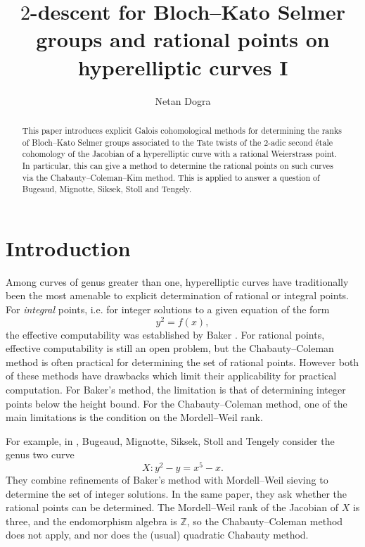 \documentclass[11pt]{amsart}
\theoremstyle{plain}
\theoremstyle{definition}
\begin{document}
\title{$2$-descent for Bloch--Kato Selmer groups and rational points on hyperelliptic curves I}
\author{Netan Dogra}
\maketitle
\pagestyle{headings}

\begin{abstract}This paper introduces explicit Galois cohomological methods for determining the ranks of Bloch--Kato Selmer groups associated to the Tate twists of the 2-adic second \'etale cohomology of the Jacobian of a hyperelliptic curve with a rational Weierstrass point. In particular, this can give a method to determine the rational points on such curves via the Chabauty--Coleman--Kim method. This is applied to answer a question of Bugeaud, Mignotte, Siksek, Stoll and Tengely.
\end{abstract}

\tableofcontents

\section{Introduction}

Among curves of genus greater than one, hyperelliptic curves have traditionally been the most amenable to explicit determination of rational or integral points. For \textit{integral} points, i.e. for integer solutions to a given equation of the form
\[
y^2 =f(x),
\]
the effective computability was established by Baker \cite{baker}. For rational points, effective computability is still an open problem, but the Chabauty--Coleman method is often practical for determining the set of rational points. However both of these methods have drawbacks which limit their applicability for practical computation. For Baker's method, the limitation is that of determining integer points below the height bound. For the Chabauty--Coleman method, one of the main limitations is the condition on the Mordell--Weil rank.

For example, in \cite{BMSST}, Bugeaud, Mignotte, Siksek, Stoll and Tengely consider the genus two curve
\[
X: y^2 -y =x^5 -x.
\]
They combine refinements of Baker's method with Mordell--Weil sieving to determine the set of integer solutions. In the same paper, they ask whether the rational points can be determined. The Mordell--Weil rank of the Jacobian of $X$ is three, and the endomorphism algebra is $\mathbb{Z}$, so the Chabauty--Coleman method does not apply, and nor does the (usual) quadratic Chabauty method.
\end{document}
